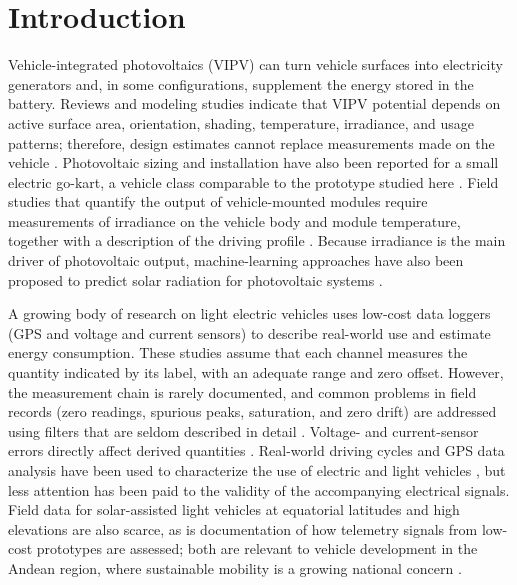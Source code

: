 \documentclass[vehicles,article,submit,moreauthors]{Definitions/mdpi}
\begin{document}
\section{Introduction}

Vehicle-integrated photovoltaics (VIPV) can turn vehicle surfaces into electricity generators and, in some configurations, supplement the energy stored in the battery. Reviews and modeling studies indicate that VIPV potential depends on active surface area, orientation, shading, temperature, irradiance, and usage patterns; therefore, design estimates cannot replace measurements made on the vehicle \citep{ref-commault,ref-sierra,ref-hoth,ref-kouzelis}. Photovoltaic sizing and installation have also been reported for a small electric go-kart, a vehicle class comparable to the prototype studied here \citep{ref-guerrero}. Field studies that quantify the output of vehicle-mounted modules require measurements of irradiance on the vehicle body and module temperature, together with a description of the driving profile \citep{ref-wetzel,ref-ng,ref-ota-irradiance,ref-ota-driving,ref-ota-curve}. Because irradiance is the main driver of photovoltaic output, machine-learning approaches have also been proposed to predict solar radiation for photovoltaic systems \citep{ref-palomo}.

A growing body of research on light electric vehicles uses low-cost data loggers (GPS and voltage and current sensors) to describe real-world use and estimate energy consumption. These studies assume that each channel measures the quantity indicated by its label, with an adequate range and zero offset. However, the measurement chain is rarely documented, and common problems in field records (zero readings, spurious peaks, saturation, and zero drift) are addressed using filters that are seldom described in detail \citep{ref-bhavsar,ref-alwreikat}. Voltage- and current-sensor errors directly affect derived quantities \citep{ref-hu,ref-zheng}. Real-world driving cycles and GPS data analysis have been used to characterize the use of electric and light vehicles \citep{ref-pfriem,ref-brady,ref-uberti,ref-gurusamy}, but less attention has been paid to the validity of the accompanying electrical signals. Field data for solar-assisted light vehicles at equatorial latitudes and high elevations are also scarce, as is documentation of how telemetry signals from low-cost prototypes are assessed; both are relevant to vehicle development in the Andean region, where sustainable mobility is a growing national concern \citep{ref-antamba}.
\end{document}
